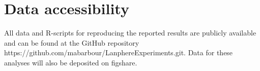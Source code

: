 \documentclass[11pt]{article}
\begin{document}
\section*{Data accessibility}
All data and R-scripts for reproducing the reported results are publicly available and can be found at the GitHub repository https://github.com/mabarbour/Lanphere\textunderscore Experiments.git. Data for these analyses will also be deposited on figshare.

\newpage{}










\end{document}
